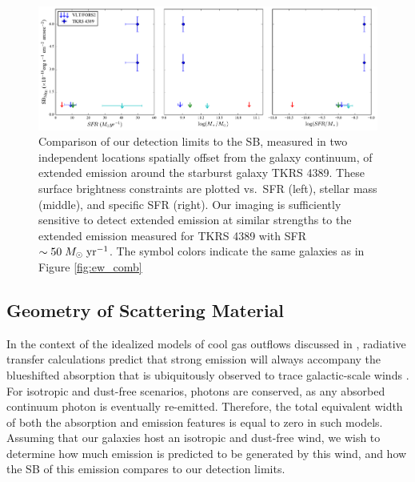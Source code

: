\documentclass[twocolumn]{aastex62}
\def \msunperyr {{\; M_{\odot}\rm \;yr^{-1}}}
\begin{document}
\begin{figure}[!htb]
\centering
\includegraphics[scale=0.57]{figure11.pdf}%
\caption{Comparison of our detection limits to the SB, measured in two independent locations spatially offset from the galaxy continuum, of extended  emission around the starburst galaxy TKRS 4389. These surface brightness constraints are plotted vs.\ SFR (left), stellar mass (middle), and specific SFR (right). Our imaging is sufficiently sensitive to detect extended emission at similar strengths to the extended emission measured for TKRS 4389 with SFR $\sim 50 \msunperyr$. The symbol colors indicate the same galaxies as in Figure \ref{fig:ew_comb}}
\label{fig:all_limits}
\end{figure}

\subsection{Geometry of Scattering Material}
In the context of the idealized models of cool gas outflows discussed in \cite{Prochaska_2011}, radiative transfer calculations predict that strong  emission will always accompany the blueshifted  absorption that is ubiquitously observed to trace galactic-scale winds \citep{Weiner2009,Martin2012,Rubin_2014}. For isotropic and dust-free scenarios, photons are conserved, as any absorbed continuum photon is eventually re-emitted.  Therefore, the total equivalent width of both the absorption and emission features is equal to zero in such models. Assuming that our galaxies host an isotropic and dust-free wind, we wish to determine how much emission is predicted to be generated by this wind, and how the SB of this emission compares to our detection limits.
\end{document}
